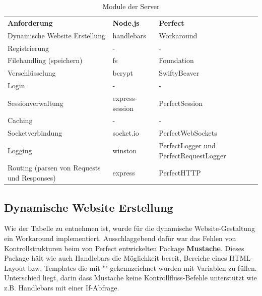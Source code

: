 \begin{table}[]
\begin{center}
\begin{tabular}{p{5cm}p{3.5cm}p{4.5cm}}
\rowcolor{gray20}	\textbf{Anforderung}									& \textbf{Node.js}	  		& \textbf{Perfect}								\\ 
\rowcolor{gray5}		Dynamische Website Erstellung							& handlebars					& Workaround								\\ 
\rowcolor{gray20}	Registrierung											& -							& -											\\ 
\rowcolor{gray5}		Filehandling (speichern)								& fs							& Foundation									\\ 
\rowcolor{gray20}	Verschlüsselung										& bcrypt					& SwiftyBeaver								\\ 
\rowcolor{gray5}		Login												& -							& -											\\
\rowcolor{gray20}	Sessionverwaltung									& express-session				& PerfectSession								\\ 
\rowcolor{gray5}		Caching												& - 							& - 											\\ 
\rowcolor{gray20}	Socketverbindung										& socket.io					& PerfectWebSockets							\\ 
\rowcolor{gray5}		Logging												& winston					& PerfectLogger und PerfectRequestLogger		\\ 
\rowcolor{gray20}	Routing (parsen von Requests und Responses)			& express					& PerfectHTTP								\\
\end{tabular}
\caption{Module der Server} \label{tab:modulederserver}
\end{center}
\end{table}

\subsection{Dynamische Website Erstellung}
Wie der Tabelle zu entnehmen ist, wurde für die dynamische Website-Gestaltung ein Workaround implementiert. Ausschlaggebend dafür war das Fehlen von Kontrollstrukturen beim von Perfect entwickelten Package \textbf{Mustache}. Dieses Package hält wie auch  Handlebars die Möglichkeit bereit, Bereiche eines HTML-Layout bzw. Templates die mit "{{}}" gekennzeichnet wurden mit Variablen zu füllen. Unterschied liegt, darin dass Mustache keine Kontrollfluss-Befehle unterstützt wie z.B. Handlebars mit einer If-Abfrage. 


